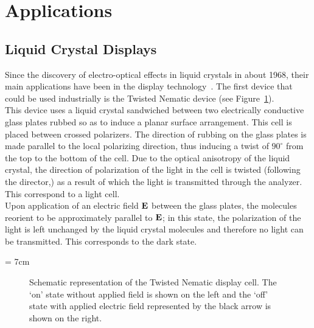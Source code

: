 \section{Applications}



\subsection{Liquid Crystal Displays}

Since the discovery of electro-optical effects in liquid crystals in about 1968, their main
applications have been in the display technology~\cite{Shanks82}. The first
device that could be used industrially is the Twisted Nematic 
device (see Figure~\ref{fig:TNcell}).\\
%
This device uses a liquid crystal sandwiched between two electrically conductive glass plates 
rubbed so as to induce a planar surface arrangement. This cell is placed between crossed polarizers. 
The direction of rubbing on the glass plates is made parallel to the local polarizing direction, thus 
inducing a twist of $90^\circ$  from the top to the bottom of the cell. Due to the optical 
anisotropy of the liquid crystal, the direction of polarization of the light in the cell is twisted 
(following the director,) as a result of which the light is transmitted through the analyzer. 
This correspond to a light cell.\\
Upon application of an electric field $\mathbf{E}$ between the glass plates, the 
molecules reorient to be approximately parallel to $\mathbf{E}$; in this state, the polarization 
of the light is left unchanged by the liquid crystal molecules and therefore no light can be 
transmitted. This corresponds to the dark state.

\picW = 7cm
\begin{figure}
	\centering
	\caption{Schematic representation of the Twisted Nematic display cell. The `on' state
	without applied field is shown on the left and the `off' state with applied electric
	field represented by the black arrow is shown on the right.}
	\label{fig:TNcell}
\end{figure}

